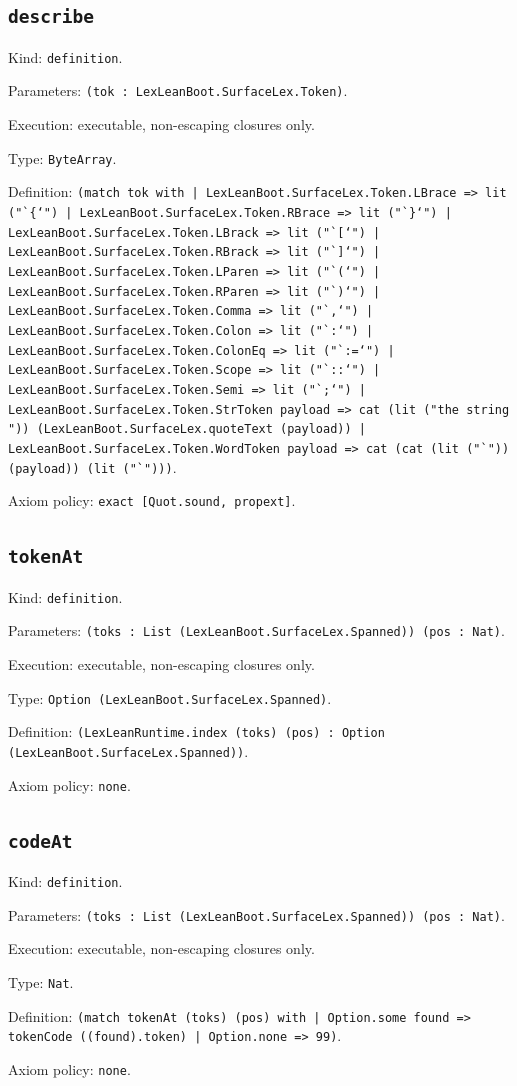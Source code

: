 \documentclass[11pt]{article}
\begin{document}
\subsection*{\texttt{describe}}
\noindent Kind: \texttt{definition}.\par
\noindent Parameters: \texttt{(tok : LexLeanBoot.SurfaceLex.Token)}.\par
\noindent Execution: executable, non-escaping closures only.\par
\noindent Type: \texttt{ByteArray}.\par
\noindent Definition: \texttt{(match tok with | LexLeanBoot.SurfaceLex.Token.LBrace => lit ("`\{`") | LexLeanBoot.SurfaceLex.Token.RBrace => lit ("`\}`") | LexLeanBoot.SurfaceLex.Token.LBrack => lit ("`[`") | LexLeanBoot.SurfaceLex.Token.RBrack => lit ("`]`") | LexLeanBoot.SurfaceLex.Token.LParen => lit ("`(`") | LexLeanBoot.SurfaceLex.Token.RParen => lit ("`)`") | LexLeanBoot.SurfaceLex.Token.Comma => lit ("`,`") | LexLeanBoot.SurfaceLex.Token.Colon => lit ("`:`") | LexLeanBoot.SurfaceLex.Token.ColonEq => lit ("`:=`") | LexLeanBoot.SurfaceLex.Token.Scope => lit ("`::`") | LexLeanBoot.SurfaceLex.Token.Semi => lit ("`;`") | LexLeanBoot.SurfaceLex.Token.StrToken payload => cat (lit ("the string ")) (LexLeanBoot.SurfaceLex.quoteText (payload)) | LexLeanBoot.SurfaceLex.Token.WordToken payload => cat (cat (lit ("`")) (payload)) (lit ("`")))}.\par
\noindent Axiom policy: \texttt{exact [Quot.sound, propext]}.\par
\subsection*{\texttt{tokenAt}}
\noindent Kind: \texttt{definition}.\par
\noindent Parameters: \texttt{(toks : List (LexLeanBoot.SurfaceLex.Spanned)) (pos : Nat)}.\par
\noindent Execution: executable, non-escaping closures only.\par
\noindent Type: \texttt{Option (LexLeanBoot.SurfaceLex.Spanned)}.\par
\noindent Definition: \texttt{(LexLeanRuntime.index (toks) (pos) : Option (LexLeanBoot.SurfaceLex.Spanned))}.\par
\noindent Axiom policy: \texttt{none}.\par
\subsection*{\texttt{codeAt}}
\noindent Kind: \texttt{definition}.\par
\noindent Parameters: \texttt{(toks : List (LexLeanBoot.SurfaceLex.Spanned)) (pos : Nat)}.\par
\noindent Execution: executable, non-escaping closures only.\par
\noindent Type: \texttt{Nat}.\par
\noindent Definition: \texttt{(match tokenAt (toks) (pos) with | Option.some found => tokenCode ((found).token) | Option.none => 99)}.\par
\noindent Axiom policy: \texttt{none}.\par
\end{document}
